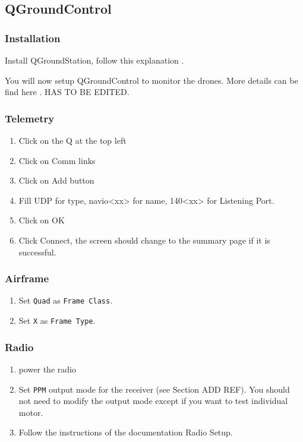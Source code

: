         \subsection{QGroundControl}
            \subsubsection{Installation}
                Install QGroundStation, follow this explanation \cite{qgc_install}.
                
                
            You will now setup QGroundControl to monitor the drones. More details can be find here \cite{qgc_setup}.{ \color{red}HAS TO BE EDITED.}
            
            \subsubsection{Telemetry}
                \begin{enumerate}
                    \item Click on the Q at the top left
                    \item Click on Comm links
                    \item Click on Add button
                    \item Fill UDP for type, navio<xx> for name, 140<xx> for Listening Port.
                    \item Click on OK
                    \item Click Connect, the screen should change to the summary page if it is successful.
                \end{enumerate}
            
            \subsubsection{Airframe}
                \begin{enumerate}
                    \item Set \texttt{Quad} as \texttt{Frame Class}.
                    \item Set \texttt{X} as \texttt{Frame Type}.
                \end{enumerate}
                
            \subsubsection{Radio}
                \begin{enumerate}
                    \item power the radio
                    \item Set \texttt{PPM} output mode for the receiver (see Section ADD REF). You should not need to modify the output mode except if you want to test individual motor.
                    \item Follow the instructions of the documentation Radio Setup.
                \end{enumerate}
                
